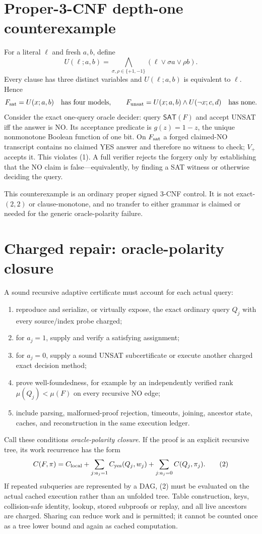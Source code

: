 \documentclass[11pt]{article}
\newcommand{\SAT}{\mathsf{SAT}}
\begin{document}
\section*{Proper-3-CNF depth-one counterexample}
For a literal $\ell$ and fresh $a,b$, define
\[
 U(\ell;a,b)=\bigwedge_{\sigma,\rho\in\{+1,-1\}}
   (\ell\vee\sigma a\vee\rho b).
\]
Every clause has three distinct variables and $U(\ell;a,b)$ is equivalent to
$\ell$.  Hence
\[
 F_{\rm sat}=U(x;a,b)
 \quad\text{has four models},
 \qquad
 F_{\rm unsat}=U(x;a,b)\wedge U(\neg x;c,d)
 \quad\text{has none}.
\]
Consider the exact one-query oracle decider: query $\SAT(F)$ and accept UNSAT
iff the answer is NO.  Its acceptance predicate is $g(z)=1-z$, the unique
nonmonotone Boolean function of one bit.  On $F_{\rm sat}$ a forged claimed-NO
transcript contains no claimed YES answer and therefore no witness to check;
$V_+$ accepts it.  This violates (1).  A full verifier rejects the forgery only
by establishing that the NO claim is false---equivalently, by finding a SAT
witness or otherwise deciding the query.

This counterexample is an ordinary proper signed 3-CNF control.  It is not
exact-$(2,2)$ or clause-monotone, and no transfer to either grammar is claimed
or needed for the generic oracle-polarity failure.

\section*{Charged repair: oracle-polarity closure}
A sound recursive adaptive certificate must account for each actual query:
\begin{enumerate}
  \item reproduce and serialize, or virtually expose, the exact ordinary query
        $Q_j$ with every source/index probe charged;
  \item for $a_j=1$, supply and verify a satisfying assignment;
  \item for $a_j=0$, supply a sound UNSAT subcertificate or execute another
        charged exact decision method;
  \item prove well-foundedness, for example by an independently verified rank
        $\mu(Q_j)<\mu(F)$ on every recursive NO edge;
  \item include parsing, malformed-proof rejection, timeouts, joining, ancestor
        state, caches, and reconstruction in the same execution ledger.
\end{enumerate}
Call these conditions \emph{oracle-polarity closure}.  If the proof is an
explicit recursive tree, its work recurrence has the form
\[
 C(F,\pi)=C_{\rm local}+\sum_{j:a_j=1}C_{\rm yes}(Q_j,w_j)
                         +\sum_{j:a_j=0}C(Q_j,\pi_j).       \tag{2}
\]
If repeated subqueries are represented by a DAG, (2) must be evaluated on the
actual cached execution rather than an unfolded tree.  Table construction,
keys, collision-safe identity, lookup, stored subproofs or replay, and all live
ancestors are charged.  Sharing can reduce work and is permitted; it cannot be
counted once as a tree lower bound and again as cached computation.
\end{document}
